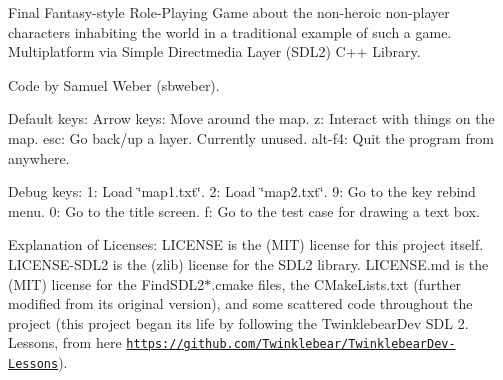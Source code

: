 Final Fantasy-\/style Role-\/\+Playing Game about the non-\/heroic non-\/player characters inhabiting the world in a traditional example of such a game. Multiplatform via Simple Directmedia Layer (S\+D\+L2) C++ Library.

Code by Samuel Weber (sbweber).

Default keys\+: Arrow keys\+: Move around the map. z\+: Interact with things on the map. esc\+: Go back/up a layer. Currently unused. alt-\/f4\+: Quit the program from anywhere.

Debug keys\+: 1\+: Load \char`\"{}map1.\+txt\char`\"{}. 2\+: Load \char`\"{}map2.\+txt\char`\"{}. 9\+: Go to the key rebind menu. 0\+: Go to the title screen. f\+: Go to the test case for drawing a text box.

Explanation of Licenses\+: L\+I\+C\+E\+N\+SE is the (M\+IT) license for this project itself. L\+I\+C\+E\+N\+S\+E-\/\+S\+D\+L2 is the (zlib) license for the S\+D\+L2 library. L\+I\+C\+E\+N\+S\+E.\+md is the (M\+IT) license for the Find\+S\+D\+L2$\ast$.cmake files, the C\+Make\+Lists.\+txt (further modified from its original version), and some scattered code throughout the project (this project began its life by following the Twinklebear\+Dev S\+DL 2. Lessons, from here \href{https://github.com/Twinklebear/TwinklebearDev-Lessons}{\tt https\+://github.\+com/\+Twinklebear/\+Twinklebear\+Dev-\/\+Lessons}). 